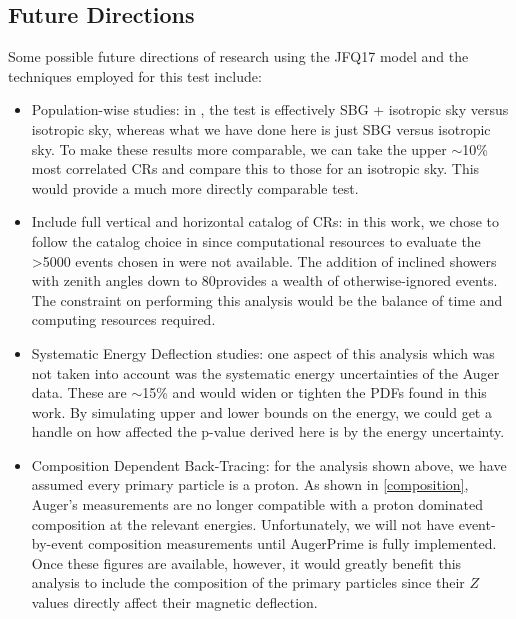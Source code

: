 \subsection{Future Directions}
Some possible future directions of research using the JFQ17 model and the techniques employed for this test include:
\begin{itemize}
\item Population-wise studies: in , the test is effectively SBG + isotropic sky versus isotropic sky, whereas what we have done here is just SBG versus isotropic sky. To make these results more comparable, we can take the upper $\sim$10\% most correlated CRs and compare this to those for an isotropic sky. This would provide a much more directly comparable test.  
\item Include full vertical and horizontal catalog of CRs: in this work, we chose to follow the catalog choice in  since computational resources to evaluate the \textgreater 5000 events chosen in \textcite{starburst} were not available. The addition of inclined showers with zenith angles down to 80\degree provides a wealth of otherwise-ignored events. The constraint on performing this analysis would be the balance of time and computing resources required. 
\item Systematic Energy Deflection studies: one aspect of this analysis which was not taken into account was the systematic energy uncertainties of the Auger data. These are $\sim$15\% and would widen or tighten the PDFs found in this work. By simulating upper and lower bounds on the energy, we could get a handle on how affected the p-value derived here is by the energy uncertainty.
\item Composition Dependent Back-Tracing: for the analysis shown above, we have assumed every primary particle is a proton. As shown in \autoref{composition}, Auger's measurements are no longer compatible with a proton dominated composition at the relevant energies. Unfortunately, we will not have event-by-event composition measurements until AugerPrime is fully implemented. Once these figures are available, however, it would greatly benefit this analysis to include the composition of the primary particles since their $Z$ values directly affect their magnetic deflection.
\end{itemize}
















